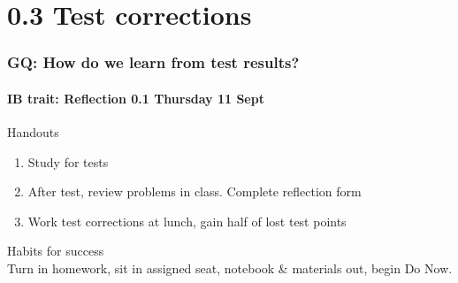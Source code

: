 \documentclass{beamer}
\begin{document}
\section{0.3 Test corrections}
  \frame
  {
    \frametitle{GQ: How do we learn from test results?}
    \framesubtitle{IB trait: Reflection \hfill \alert{0.1 Thursday 11 Sept}}

    \begin{block}{Handouts}
      \begin{enumerate}
        \item Study for tests
        \item After test, review problems in class. Complete reflection form
        \item Work test corrections at lunch, gain half of lost test points
      \end{enumerate}
    \end{block}
    Habits for success\\[0.25cm]
    Turn in homework, sit in assigned seat, notebook \& materials out, begin Do Now.
  }
\end{document}
